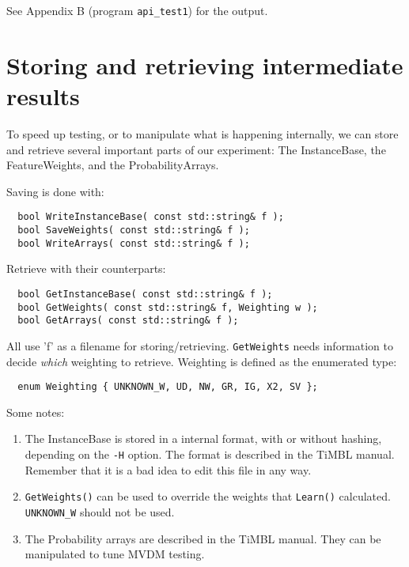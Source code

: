 \documentclass{report}
\begin{document}
See Appendix B (program {\tt api\_test1}) for the output.

\section{Storing and retrieving intermediate results}

To speed up testing, or to manipulate what is happening internally, we
can store and retrieve several important parts of our experiment: The
InstanceBase, the FeatureWeights, and the ProbabilityArrays.

Saving is done with:

\begin{footnotesize}
\begin{verbatim}
  bool WriteInstanceBase( const std::string& f );
  bool SaveWeights( const std::string& f );
  bool WriteArrays( const std::string& f );
\end{verbatim}
\end{footnotesize}

Retrieve with their counterparts:

\begin{footnotesize}
\begin{verbatim}
  bool GetInstanceBase( const std::string& f );
  bool GetWeights( const std::string& f, Weighting w );
  bool GetArrays( const std::string& f );
\end{verbatim}
\end{footnotesize}

All use 'f' as a filename for storing/retrieving. {\tt GetWeights} needs
information to decide {\em which}\/ weighting to retrieve.
Weighting is defined as the enumerated type:

\begin{footnotesize}
\begin{verbatim}
  enum Weighting { UNKNOWN_W, UD, NW, GR, IG, X2, SV };
\end{verbatim}
\end{footnotesize}

Some notes:

\begin{enumerate}
\item The InstanceBase is stored in a internal format, with or without
hashing, depending on the {\tt -H} option. The format is described in the
TiMBL manual. Remember that it is a bad idea to edit this file in any way.
\item {\tt GetWeights()} can be used to override the weights that
{\tt Learn()} calculated. {\tt UNKNOWN\_W} should not be used.
\item The Probability arrays are described in the TiMBL manual. They can be
manipulated to tune MVDM testing.
\end{enumerate}
\end{document}
